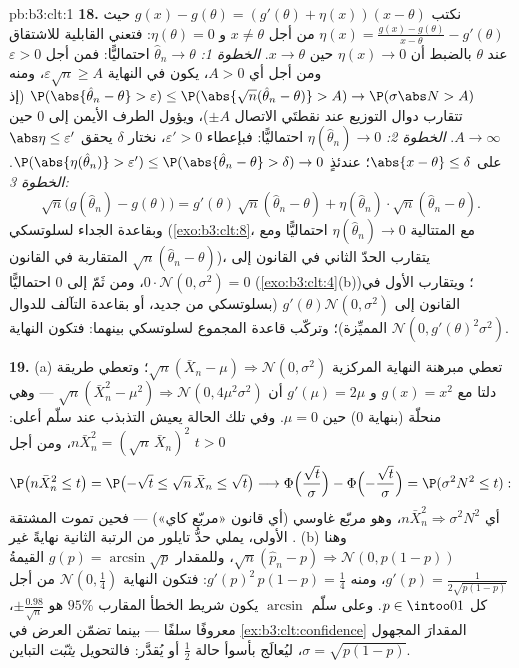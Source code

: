 \begin{solution}{pb:b3:clt:1}
\textbf{18.} نكتب $g(x) - g(\theta) = (g'(\theta) +
\eta(x))(x - \theta)$ حيث $\eta(x) = \frac{g(x) -
g(\theta)}{x - \theta} - g'(\theta)$ من أجل $x \neq \theta$
و $\eta(\theta) = 0$: فتعني القابلية للاشتقاق عند $\theta$ بالضبط أن
$\eta(x) \to 0$ حين $x \to \theta$. \emph{الخطوة 1:} $\hat\theta_n \to \theta$
احتماليًّا: فمن أجل $\varepsilon > 0$ ومن أجل أي $A > 0$، يكون في النهاية
$\varepsilon\sqrt n \geq A$، ومنه $\P(\abs{\hat\theta_n -
\theta} > \varepsilon) \leq \P(\abs{\sqrt
n(\hat\theta_n - \theta)} > A) \to \P(\sigma\abs N > A)$ (إذ تتقارب دوال التوزيع عند نقطتَي
الاتصال $\pm A$)، ويؤول الطرف الأيمن إلى $0$ حين $A \to
\infty$.
\emph{الخطوة 2:} $\eta(\hat\theta_n) \to 0$ احتماليًّا: فبإعطاء $\varepsilon' > 0$، نختار
$\delta$ يحقق $\abs\eta \leq \varepsilon'$ على $\abs{x - \theta} \leq
\delta$؛ عندئذٍ $\P(\abs{\eta(\hat\theta_n)} > \varepsilon')
\leq \P(\abs{\hat\theta_n - \theta} > \delta) \to 0$.
\emph{الخطوة 3:}
\[
\sqrt n\bigl(g(\hat\theta_n) - g(\theta)\bigr) =
g'(\theta)\,\sqrt n(\hat\theta_n - \theta) +
\eta(\hat\theta_n)\cdot\sqrt n(\hat\theta_n - \theta) .
\]
وبقاعدة الجداء لسلوتسكي (\cref{exo:b3:clt:8}، مع المتتالية $\eta(\hat\theta_n) \to 0$
احتماليًّا ومع $\sqrt n(\hat\theta_n - \theta)$ المتقاربة في القانون)، يتقارب الحدّ
الثاني في القانون إلى $0\cdot\mathcal N(0,
\sigma^2) = 0$، ومن ثَمّ إلى $0$ احتماليًّا
(\cref{exo:b3:clt:4}(b))؛ ويتقارب الأول في القانون إلى $g'(\theta)\mathcal N(0, \sigma^2)$
(بسلوتسكي من جديد، أو بقاعدة التآلف للدوال المميِّزة)؛ وتركّب
قاعدة المجموع لسلوتسكي بينهما: فتكون النهاية $\mathcal N(0,
g'(\theta)^2\sigma^2)$.

\textbf{19.} (a) تعطي مبرهنة النهاية المركزية $\sqrt n(\bar X_n - \mu)
\Rightarrow \mathcal N(0, \sigma^2)$؛ وتعطي
طريقة دلتا مع $g(x) = x^2$ و $g'(\mu) = 2\mu$ أن $\sqrt n(\bar
X_n^2 - \mu^2) \Rightarrow \mathcal N(0, 4\mu^2\sigma^2)$ ---
وهي منحلّة (بنهاية $0$) حين $\mu = 0$. وفي تلك الحالة يعيش
التذبذب عند سلّم أعلى: $n\bar X_n^2 =
(\sqrt n\,\bar X_n)^2$، ومن أجل $t > 0$
\[
\P\bigl(n\bar X_n^2 \leq t\bigr) = \P\bigl(-\sqrt t \leq
\sqrt n\,\bar X_n \leq \sqrt t\bigr) \longrightarrow
\Phi\Bigl(\frac{\sqrt t}\sigma\Bigr) -
\Phi\Bigl(-\frac{\sqrt t}\sigma\Bigr) = \P(\sigma^2N^2
\leq t) :
\]
أي $n\bar X_n^2 \Rightarrow \sigma^2N^2$، وهو مربّع غاوسي (أي قانون «مربّع كاي») --- فحين
تموت المشتقة الأولى، يملي حدُّ تايلور من الرتبة الثانية نهايةً
غير . (b) وهنا $\sqrt n(\hat p_n - p)
\Rightarrow \mathcal N(0, p(1 - p))$، وللمقدار $g(p) =
\arcsin\sqrt p$ القيمةُ $g'(p) = \frac1{2\sqrt{p(1 - p)}}$،
ومنه $g'(p)^2\,p(1 - p) = \frac14$: فتكون النهاية $\mathcal
N(0, \frac14)$ من أجل كل
$p \in \intoo01$. وعلى سلّم $\arcsin$ يكون شريط الخطأ المقارب
$95\%$ هو $\pm
\frac{0.98}{\sqrt n}$، معروفًا سلفًا --- بينما تضمّن العرض في
\cref{ex:b3:clt:confidence} المقدارَ المجهول $\sigma = \sqrt{p(1-p)}$، ليُعالَج بأسوأ حالة
$\frac12$ أو يُقدَّر: فالتحويل \emph{يثبّت} التباين.


\end{solution}
